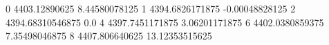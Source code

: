0 4403.12890625 8.44580078125
1 4394.6826171875 -0.00048828125
2 4394.68310546875 0.0
4 4397.7451171875 3.06201171875
6 4402.0380859375 7.35498046875
8 4407.806640625 13.12353515625
